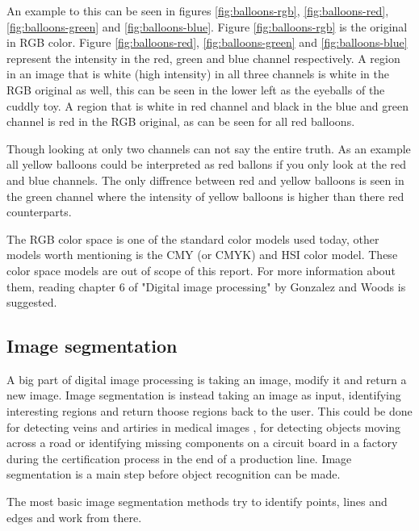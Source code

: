 An example to this can be seen in figures \ref{fig:balloons-rgb},
\ref{fig:balloons-red}, \ref{fig:balloons-green} and \ref{fig:balloons-blue}.
Figure \ref{fig:balloons-rgb} is the original in RGB color. Figure \ref{fig:balloons-red},
\ref{fig:balloons-green} and \ref{fig:balloons-blue} represent the intensity in the red,
green and blue channel respectively. A region in an image that is white (high
intensity) in all three channels is white in the RGB original as well, this can
be seen in the lower left as the eyeballs of the cuddly toy. A region that is white
in red channel and black in the blue and green channel is red in the RGB original, as
can be seen for all red balloons.

Though looking at only two channels can not say the entire truth. As an example all
yellow balloons could be interpreted as red ballons if you only look at the
red and blue channels. The only diffrence between red and yellow balloons is
seen in the green channel where the intensity of yellow balloons is higher than
there red counterparts.

The RGB color space is one of the standard color models used today, other models
worth mentioning is the CMY (or CMYK) and HSI color model. These color space
models are out of scope of this report. For more information about them,
reading chapter 6 of "Digital image processing" by Gonzalez and Woods \cite{gonzalez2008} is suggested.


\subsection{Image segmentation}
A big part of digital image processing is taking an image, modify it and
return a new image. Image segmentation is instead taking an image as input,
identifying interesting regions and return thoose regions back to the user.
This could be done for detecting veins and artiries in medical images \cite{olena2010},
for detecting objects moving across a road or identifying missing components on
a circuit board in a factory during the certification process in the end of a production line.
Image segmentation is a main step before object recognition can be made.

The most basic image segmentation methods try to identify points, lines and edges
and work from there.

